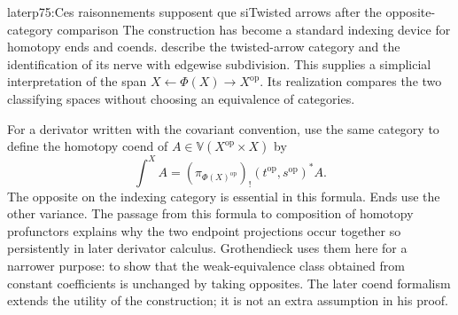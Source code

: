 \begin{dcomment}{later}{p75:Ces raisonnements supposent que si}{Twisted arrows after the opposite-category comparison}
The construction has become a standard indexing device for homotopy ends and coends. \citet[Example~7.2.9 and the footnote in Section~7.8]{Riehl2014} describe the twisted-arrow category and the identification of its nerve with edgewise subdivision. This supplies a simplicial interpretation of the span $X\leftarrow\Phi(X)\to X^{\mathrm{op}}$. Its realization compares the two classifying spaces without choosing an equivalence of categories.

For a derivator written with the covariant convention, \citet[Section~5]{PontoShulman2016} use the same category to define the homotopy coend of $A\in\mathbb V(X^{\mathrm{op}}\times X)$ by
\[
 \int^{X}A=(\pi_{\Phi(X)^{\mathrm{op}}})_!
       (t^{\mathrm{op}},s^{\mathrm{op}})^*A.
\]
The opposite on the indexing category is essential in this formula. Ends use the other variance. The passage from this formula to composition of homotopy profunctors explains why the two endpoint projections occur together so persistently in later derivator calculus. Grothendieck uses them here for a narrower purpose: to show that the weak-equivalence class obtained from constant coefficients is unchanged by taking opposites. The later coend formalism extends the utility of the construction; it is not an extra assumption in his proof.
\end{dcomment}

